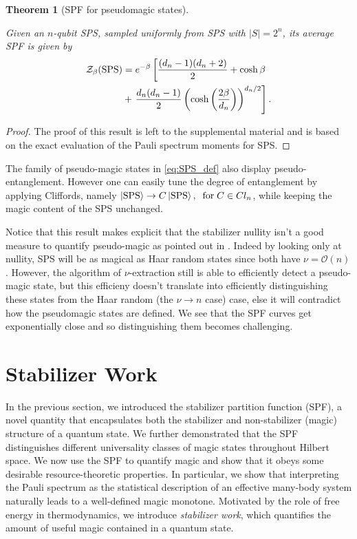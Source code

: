 \documentclass[aps,pra,superscriptaddress,twocolumn,longbibliography]{revtex4-2}
\newcounter{algorithm}
\newtheorem{theorem}{\textbf{Theorem}}
\begin{document}
\begin{theorem}[SPF for pseudomagic states]\label{Theorem:Pseudorandom_SPF}

Given an $n$-qubit SPS, sampled uniformly from SPS with  $|S|=2^{n}$, its average SPF is given by  
%
\begin{align*}
    \mathcal{Z}_{\beta}({\rm SPS})&=e^{-\beta}
\left[\frac{(d_n-1)(d_n+2)}{2}+\cosh{\beta} \right. \\
& + \left. \frac{d_n(d_n-1)}{2}
\left(\cosh\left(\frac{2\beta}{d_n}\right)\right)^{d_n/2}
\right].
\end{align*}
%
\end{theorem}

\begin{proof}
The proof of this result is left to the supplemental material and is based on the exact evaluation of the Pauli spectrum moments for SPS.
\end{proof}
%
The family of pseudo-magic states in \eqref{eq:SPS_def} also display pseudo-entanglement. However one can easily tune the degree of entanglement by applying Cliffords, namely $\ket{\rm SPS} \to C\ket{\rm SPS}, \;\; {\rm for} \; C\in Cl_{n}$, while keeping the magic content of the SPS unchanged.

Notice that this result makes explicit that the stabilizer nullity isn't a good measure to quantify pseudo-magic as pointed out in \cite{Gu/pseudomagic/2024}. Indeed by looking only at nullity, SPS will be as magical as Haar random states since both have $\nu=\mathcal{O}(n)$. 
However, the algorithm of $\nu$-extraction still is able to efficiently detect a pseudo-magic state, but this efficieny doesn't translate into efficiently distinguishing these states from the Haar random (the $\nu \to n$ case) case, else it will contradict how the pseudomagic states are defined. We see that the SPF curves get exponentially close and so distinguishing them becomes challenging.


\section{Stabilizer Work%
}\label{sec:SW}

In the previous section, we introduced the stabilizer partition function (SPF), a novel quantity that encapsulates both the stabilizer and non-stabilizer (magic) structure of a quantum state.
We further demonstrated that the SPF distinguishes different universality classes of magic states throughout Hilbert space.
We now use the SPF to quantify magic and show that it obeys some desirable resource-theoretic properties.
In particular, we show that interpreting the Pauli spectrum as the statistical description of an effective many-body system naturally leads to a well-defined magic monotone. 
Motivated by the role of free energy in thermodynamics, we introduce \textit{stabilizer work}, which quantifies the amount of useful magic contained in a quantum state.
\end{document}
